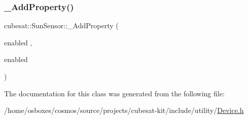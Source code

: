 \mbox{\label{classcubesat_1_1SunSensor_abd429085c8bde7339acbbaf4b1d30e0d}} 
\subsubsection{\texorpdfstring{\+\_\+\+Add\+Property()}{\_AddProperty()}\hspace{0.1cm}{\footnotesize\ttfamily [6/6]}}
{\footnotesize\ttfamily cubesat\+::\+Sun\+Sensor\+::\+\_\+\+Add\+Property (\begin{DoxyParamCaption}\item[{enabled}]{,  }\item[{enabled}]{ }\end{DoxyParamCaption})}



The documentation for this class was generated from the following file\+:\begin{DoxyCompactItemize}
\item 
/home/osboxes/cosmos/source/projects/cubesat-\/kit/include/utility/\hyperlink{Device_8h}{Device.\+h}\end{DoxyCompactItemize}
